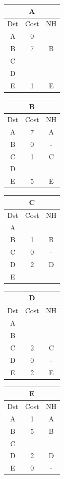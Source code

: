 \documentclass[10pt]{article}
\begin{document}
	\begin{table}[h!]
		\begin{tabular}{|c||c||c|}
 			\hline
	 		\multicolumn{3}{|c|}{A} \\
 			\hline
 			Dst & Cost & NH\\
 			\hline
 			A & 0 & - \\
 			B & 7 & B \\
 			C &   &   \\
 			D &   &   \\
 			E & 1 & E \\
 			\hline
		\end{tabular}
		\begin{tabular}{|c||c||c|}
 			\hline
	 		\multicolumn{3}{|c|}{B} \\
 			\hline
 			Dst & Cost & NH\\
 			\hline
 			A & 7 & A \\
 			B & 0 & - \\
 			C & 1 & C  \\
 			D &   &   \\
 			E & 5 & E \\
 			\hline
		\end{tabular}
		\begin{tabular}{|c||c||c|}
 			\hline
	 		\multicolumn{3}{|c|}{C} \\
 			\hline
 			Dst & Cost & NH\\
 			\hline
 			A &   &   \\
 			B & 1 & B \\
 			C & 0 & - \\
 			D & 2 & D \\
 			E &   &   \\
 			\hline
		\end{tabular}
		\begin{tabular}{|c||c||c|}
 			\hline
	 		\multicolumn{3}{|c|}{D} \\
 			\hline
 			Dst & Cost & NH\\
 			\hline
 			A &   &   \\
 			B &   &   \\
 			C & 2 & C \\
 			D & 0 & - \\
 			E & 2 & E \\
 			\hline
		\end{tabular}
		\begin{tabular}{|c||c||c|}
 			\hline
	 		\multicolumn{3}{|c|}{E} \\
 			\hline
 			Dst & Cost & NH\\
 			\hline
 			A & 1 & A \\
 			B & 5 & B \\
 			C &   &   \\
 			D & 2 & D \\
 			E & 0 & - \\
 			\hline
		\end{tabular}
	\end{table}
\end{document}
